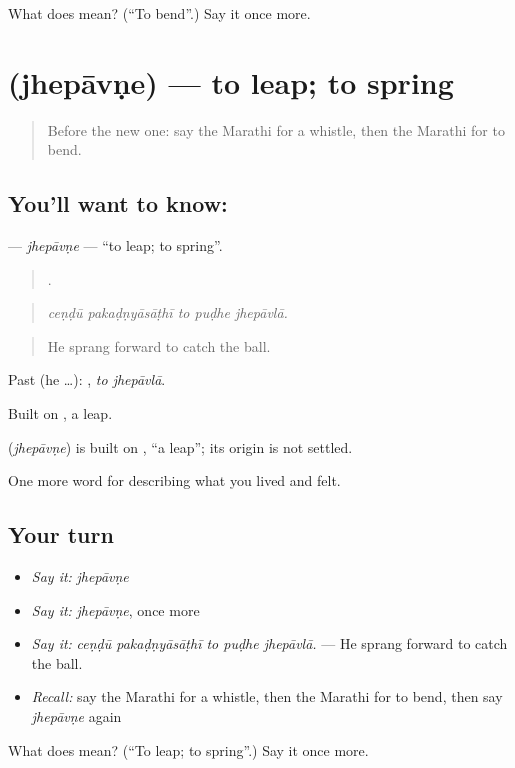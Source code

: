 \begin{tcolorbox}[breakable,colback=teal!4,colframe=teal!35!black,title={Before you move on}]
What does  mean? (\textquotedblleft{}To bend\textquotedblright{}.) Say it once more.
\end{tcolorbox}
\section[\texorpdfstring{\mr{झेपावणे} (jhepāvṇe)}{झेपावणे (jhepāvṇe)}]{ (jhepāvṇe) — to leap; to spring}

\label{lesson:MR-C533-jhepavne}



\begin{quote}
Before the new one: say the Marathi for a whistle, then the Marathi for to bend.
\end{quote}

\subsection*{You'll want to know: }
\textbf{} — \emph{jhepāvṇe} — \textquotedblleft{}to leap; to spring\textquotedblright{}.

\begin{quote}
    .
\end{quote}

\begin{quote}
\emph{ceṇḍū pakaḍṇyāsāṭhī to puḍhe jhepāvlā.}
\end{quote}

\begin{quote}
He sprang forward to catch the ball.
\end{quote}

Past (he …):  , \emph{to jhepāvlā}.

Built on , a leap.

\begin{cousinweb}
\textbf{} (\emph{jhepāvṇe}) is built on , \textquotedblleft{}a leap\textquotedblright{}; its origin is not settled.
\end{cousinweb}

\begin{grammarlens}[title={What you've built}]
One more word for describing what you lived and felt.
\end{grammarlens}

\subsection*{Your turn}
\begin{itemize}
\raggedright
  \item \emph{Say it:} \emph{jhepāvṇe}
  \item \emph{Say it:} \emph{jhepāvṇe}, once more
  \item \emph{Say it:} \emph{ceṇḍū pakaḍṇyāsāṭhī to puḍhe jhepāvlā.} — He sprang forward to catch the ball.
  \item \emph{Recall:} say the Marathi for a whistle, then the Marathi for to bend, then say \emph{jhepāvṇe} again
\end{itemize}

\begin{tcolorbox}[breakable,colback=teal!4,colframe=teal!35!black,title={Before you move on}]
What does  mean? (\textquotedblleft{}To leap; to spring\textquotedblright{}.) Say it once more.
\end{tcolorbox}
